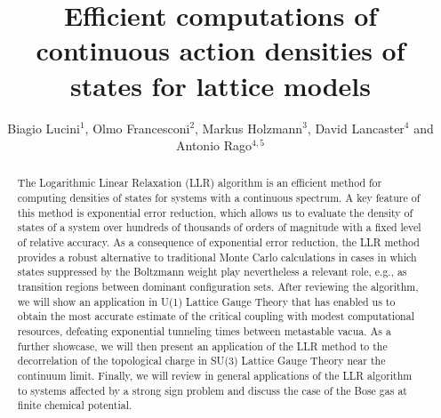 \documentclass[a4paper]{jpconf}
\begin{document}
\title{Efficient computations of continuous action densities of states for lattice models}

\author{Biagio Lucini$^{1}$, Olmo Francesconi$^2$,
  Markus Holzmann$^3$, David Lancaster$^4$ and Antonio Rago$^{4,5}$}

\address{$^1$ Mathematics Department and Swansea Academy of Advanced
  Computing, Swansea University, Bay Campus, SA1 8EN, Swansea, Wales,
  United Kingdom}
\address{$^2$ IMADA and CP3-Origins, Univ. of Southern Denmark, Campusvej 55, DK-5230 Odense, Denmark}
\address{$^3$ Universit\'e Grenoble Alpes, CNRS, LPMMC, 3800 Grenoble, France}
\address{$^4$ Centre for Mathematical Sciences, University of Plymouth,
  Plymouth, PL4 8AA, United Kingdom}
\address{$^5$ CERN, Theoretical Physics Department, 1211 Geneva 23, Switzerland}


\begin{abstract}
The Logarithmic Linear Relaxation (LLR) algorithm is an efficient
method for computing densities of states for systems with a continuous
spectrum. A key feature of this method is exponential error reduction,
which allows us to evaluate the density of states of a system over
hundreds of thousands of orders of magnitude with a fixed level of
relative accuracy. As a consequence of exponential error reduction,
the LLR method provides a robust 
alternative to traditional Monte Carlo calculations in cases in which states
suppressed by the Boltzmann weight play nevertheless a relevant
role, e.g., as transition regions between dominant
configuration sets. After reviewing the algorithm, we will show an
application in U(1) Lattice Gauge Theory  that has enabled us to obtain the most
accurate estimate of the critical coupling with modest computational
resources, defeating exponential tunneling times between metastable
vacua. As a further showcase, we will then present an application of
the LLR method to the decorrelation of 
the topological charge in SU(3) Lattice Gauge Theory near the
continuum limit. Finally, we will review in general applications of
the LLR algorithm to systems affected by a strong sign problem and
discuss the case of the Bose gas at finite chemical potential.   
\end{abstract}
\end{document}
